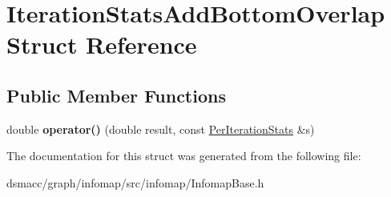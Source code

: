 \hypertarget{structIterationStatsAddBottomOverlap}{}\section{Iteration\+Stats\+Add\+Bottom\+Overlap Struct Reference}
\label{structIterationStatsAddBottomOverlap}
\subsection*{Public Member Functions}
\begin{DoxyCompactItemize}
\item 
\mbox{\label{structIterationStatsAddBottomOverlap_a7c8a854529c0ba1f67a6d59589e26e85}} 
double {\bfseries operator()} (double result, const \mbox{\hyperlink{structPerIterationStats}{Per\+Iteration\+Stats}} \&s)
\end{DoxyCompactItemize}


The documentation for this struct was generated from the following file\+:\begin{DoxyCompactItemize}
\item 
dsmacc/graph/infomap/src/infomap/Infomap\+Base.\+h\end{DoxyCompactItemize}
